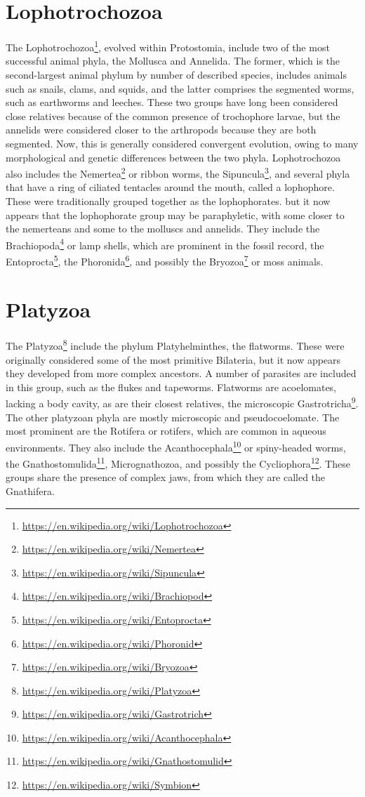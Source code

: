 \documentclass[]{book}
\let\rmarkdownfootnote\footnote%
\def\footnote{\protect\rmarkdownfootnote}
\renewcommand{\href}[2]{#2\footnote{\url{#1}}}
\theoremstyle{definition}
\theoremstyle{definition}
\theoremstyle{definition}
\theoremstyle{remark}
\begin{document}
\section{Lophotrochozoa}\label{lophotrochozoa}

The \href{https://en.wikipedia.org/wiki/Lophotrochozoa}{Lophotrochozoa},
evolved within Protostomia, include two of the most successful animal
phyla, the Mollusca and Annelida. The former, which is the
second-largest animal phylum by number of described species, includes
animals such as snails, clams, and squids, and the latter comprises the
segmented worms, such as earthworms and leeches. These two groups have
long been considered close relatives because of the common presence of
trochophore larvae, but the annelids were considered closer to the
arthropods because they are both segmented. Now, this is generally
considered convergent evolution, owing to many morphological and genetic
differences between the two phyla. Lophotrochozoa also includes the
\href{https://en.wikipedia.org/wiki/Nemertea}{Nemertea} or ribbon worms, the \href{https://en.wikipedia.org/wiki/Sipuncula}{Sipuncula}, and several phyla that have a
ring of ciliated tentacles around the mouth, called a lophophore. These
were traditionally grouped together as the lophophorates. but it now
appears that the lophophorate group may be paraphyletic, with some
closer to the nemerteans and some to the molluscs and annelids. They
include the \href{https://en.wikipedia.org/wiki/Brachiopod}{Brachiopoda} or lamp shells, which are prominent in the
fossil record, the \href{https://en.wikipedia.org/wiki/Entoprocta}{Entoprocta}, the \href{https://en.wikipedia.org/wiki/Phoronid}{Phoronida}, and possibly the \href{https://en.wikipedia.org/wiki/Bryozoa}{Bryozoa}
or moss animals.

\section{Platyzoa}\label{platyzoa}

The \href{https://en.wikipedia.org/wiki/Platyzoa}{Platyzoa} include the
phylum Platyhelminthes, the flatworms. These were originally considered
some of the most primitive Bilateria, but it now appears they developed
from more complex ancestors. A number of parasites are included in this
group, such as the flukes and tapeworms. Flatworms are acoelomates,
lacking a body cavity, as are their closest relatives, the microscopic
\href{https://en.wikipedia.org/wiki/Gastrotrich}{Gastrotricha}. The other platyzoan phyla are mostly microscopic and
pseudocoelomate. The most prominent are the Rotifera or rotifers, which
are common in aqueous environments. They also include the \href{https://en.wikipedia.org/wiki/Acanthocephala}{Acanthocephala}
or spiny-headed worms, the \href{https://en.wikipedia.org/wiki/Gnathostomulid}{Gnathostomulida}, Micrognathozoa, and possibly
the \href{https://en.wikipedia.org/wiki/Symbion}{Cycliophora}. These groups share the presence of complex jaws, from
which they are called the Gnathifera. 
\end{document}
